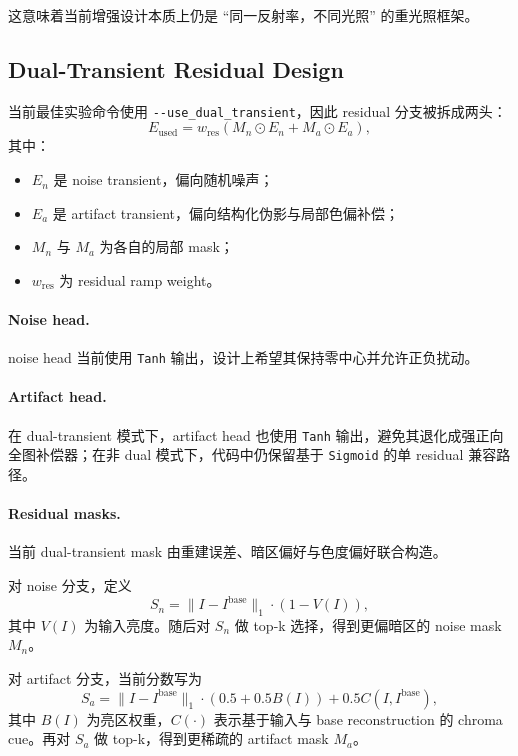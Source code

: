 \documentclass[11pt]{article}
\begin{document}
这意味着当前增强设计本质上仍是 ``同一反射率，不同光照'' 的重光照框架。

\subsection{Dual-Transient Residual Design}

当前最佳实验命令使用 \verb|--use_dual_transient|，因此 residual 分支被拆成两头：
\begin{equation}
    E_{\text{used}} = w_{\text{res}} \left(M_n \odot E_n + M_a \odot E_a\right),
\end{equation}
其中：
\begin{itemize}[leftmargin=1.5em]
    \item $E_n$ 是 noise transient，偏向随机噪声；
    \item $E_a$ 是 artifact transient，偏向结构化伪影与局部色偏补偿；
    \item $M_n$ 与 $M_a$ 为各自的局部 mask；
    \item $w_{\text{res}}$ 为 residual ramp weight。
\end{itemize}

\paragraph{Noise head.}
noise head 当前使用 \verb|Tanh| 输出，设计上希望其保持零中心并允许正负扰动。

\paragraph{Artifact head.}
在 dual-transient 模式下，artifact head 也使用 \verb|Tanh| 输出，避免其退化成强正向全图补偿器；在非 dual 模式下，代码中仍保留基于 \verb|Sigmoid| 的单 residual 兼容路径。

\paragraph{Residual masks.}
当前 dual-transient mask 由重建误差、暗区偏好与色度偏好联合构造。

对 noise 分支，定义
\begin{equation}
    S_n = \|I - I^{\text{base}}\|_1 \cdot (1 - V(I)),
\end{equation}
其中 $V(I)$ 为输入亮度。随后对 $S_n$ 做 top-k 选择，得到更偏暗区的 noise mask $M_n$。

对 artifact 分支，当前分数写为
\begin{equation}
    S_a
    =
    \|I - I^{\text{base}}\|_1 \cdot (0.5 + 0.5 B(I))
    + 0.5 C(I, I^{\text{base}}),
\end{equation}
其中 $B(I)$ 为亮区权重，$C(\cdot)$ 表示基于输入与 base reconstruction 的 chroma cue。再对 $S_a$ 做 top-k，得到更稀疏的 artifact mask $M_a$。
\end{document}
